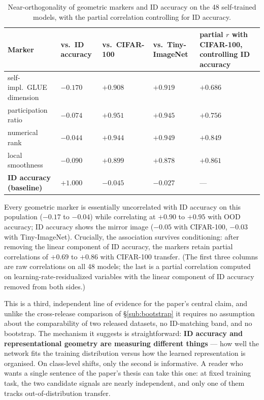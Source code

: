 \documentclass[10pt]{article} %
\newcommand{\srcref}[1]{\S\ref{#1}}
\begin{document}
\begin{table}[t]
\caption{Near-orthogonality of geometric markers and ID accuracy on the 48 self-trained models, with the partial correlation controlling for ID accuracy.}
\label{tab:orthogonal}
\centering
\small
\setlength{\tabcolsep}{4pt}
\begin{tabular}{@{}p{3.3cm}p{2.1cm}p{2.2cm}p{2.3cm}p{4.1cm}@{}}
\hline
Marker & vs.\ ID accuracy & vs.\ CIFAR-100 & vs.\ Tiny-ImageNet & partial $r$ with CIFAR-100, controlling ID accuracy \\
\hline
self-impl.\ GLUE dimension & \textbf{$-0.170$} & $+0.908$ & $+0.919$ & $+0.686$ \\
\hline
participation ratio & \textbf{$-0.074$} & $+0.951$ & $+0.945$ & $+0.756$ \\
\hline
numerical rank & \textbf{$-0.044$} & $+0.944$ & $+0.949$ & $+0.849$ \\
\hline
local smoothness & \textbf{$-0.090$} & $+0.899$ & $+0.878$ & $+0.861$ \\
\hline
\textbf{ID accuracy (baseline)} & $+1.000$ & $-0.045$ & $-0.027$ & --- \\
\hline
\end{tabular}
\end{table}

Every geometric marker is essentially uncorrelated with ID accuracy on this population ($-0.17$ to $-0.04$) while correlating at $+0.90$ to $+0.95$ with OOD accuracy; ID accuracy shows the mirror image ($-0.05$ with CIFAR-100, $-0.03$ with Tiny-ImageNet). Crucially, the association survives conditioning: after removing the linear component of ID accuracy, the markers retain partial correlations of $+0.69$ to $+0.86$ with CIFAR-100 transfer. (The first three columns are raw correlations on all 48 models; the last is a partial correlation computed on learning-rate-residualized variables with the linear component of ID accuracy removed from both sides.)

This is a third, independent line of evidence for the paper's central claim, and unlike the cross-release comparison of \srcref{sub:bootstrap} it requires no assumption about the comparability of two released datasets, no ID-matching band, and no bootstrap. The mechanism it suggests is straightforward: \textbf{ID accuracy and representational geometry are measuring different things} --- how well the network fits the training distribution versus how the learned representation is organised. On class-level shifts, only the second is informative. A reader who wants a single sentence of the paper's thesis can take this one: at fixed training task, the two candidate signals are nearly independent, and only one of them tracks out-of-distribution transfer.
\end{document}
